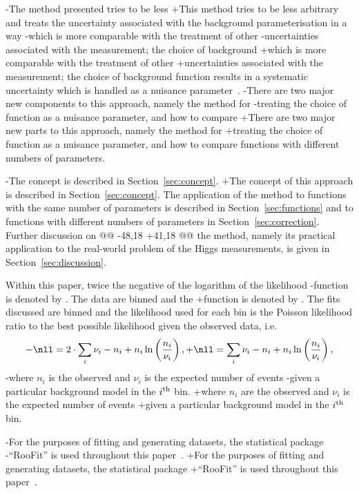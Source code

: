 -The method presented tries to be less
+This method tries to be less 
 arbitrary and treats the uncertainty associated with the
 background parameterisation in a way
-which is more comparable with the treatment of other
-uncertainties associated with the measurement; the choice of background
+which is more comparable with the treatment of other 
+uncertainties associated with the measurement; the choice of background 
 function results in a systematic uncertainty
 which is handled as a nuisance parameter~\cite{ref:intro:nusiances}.
-There are two major new components to this approach, namely the method for
-treating the choice of function as a nuisance parameter, and how to compare
+There are two major new parts to this approach, namely the method for
+treating the choice of function as a nuisance parameter, and how to compare 
 functions with different numbers of parameters.
 
-The concept is described in Section~\ref{sec:concept}.
+The concept of this approach is described in Section~\ref{sec:concept}.
 The application of the method to functions with the same number of parameters
 is described in Section~\ref{sec:functions} and to functions with different
 numbers of parameters in Section~\ref{sec:correction}. Further discussion on
@@ -48,18 +41,18 @@ the method, namely its practical application to the real-world problem of
 the Higgs measurements, is given in Section~\ref{sec:discussion}.
 
 Within this paper, twice the negative of the logarithm of the likelihood
-function is denoted by \nll. The data are binned and the
+function is denoted by \nll. The fits discussed are binned and the 
 likelihood used for each bin is the Poisson likelihood ratio to the best
 possible likelihood given the observed data, i.e.
 \begin{equation}
-\nll = 2\cdot\sum_{i} \nu_i - n_i + n_i \ln\left(\frac{n_i}{\nu_i}\right),
+\nll = \sum_{i} \nu_i - n_i + n_i \ln\left(\frac{n_i}{\nu_i}\right),
 \label{eqn:introduction:def2NLL}
 \end{equation}
-where $n_{i}$ is the observed and $\nu_{i}$ is the expected number of events
-given a particular background model in the $i^{\rm th}$ bin.
+where $n_{i}$ are the observed and $\nu_{i}$ is the expected number of events 
+given a particular background model in the $i^{\rm th}$ bin. 
 
-For the purposes of fitting and generating datasets, the statistical package
-``RooFit'' is used throughout this paper~\cite{ref:roofit}.
+For the purposes of fitting and generating datasets, the statistical package 
+``RooFit'' is used throughout this paper~\cite{ref:roofit}. 
 
